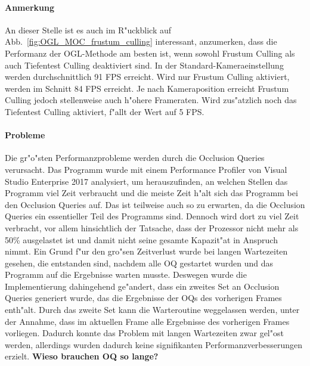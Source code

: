 \documentclass[journal]{vgtc}
\begin{document}
\paragraph{Anmerkung} An dieser Stelle ist es auch im R"uckblick auf Abb.\ \ref{fig:OGL_MOC_frustum_culling} interessant, anzumerken, dass die Performanz der OGL-Methode am besten ist, wenn sowohl Frustum Culling als auch Tiefentest Culling deaktiviert sind. In der Standard-Kameraeinstellung werden durchschnittlich 91 FPS erreicht. Wird nur Frustum Culling aktiviert, werden im Schnitt 84 FPS erreicht.
Je nach Kameraposition erreicht Frustum Culling jedoch stellenweise auch h"ohere Frameraten.
Wird zus"atzlich noch das Tiefentest Culling aktiviert, f"allt der Wert auf 5 FPS.\\

\paragraph{Probleme} Die gr"o"sten Performanzprobleme werden durch die Occlusion Queries verursacht.
Das Programm wurde mit einem Performance Profiler von Visual Studio Enterprise 2017 analysiert, um herauszufinden, an welchen Stellen das Programm viel Zeit verbraucht und die meiste Zeit h"alt sich das Programm bei den Occlusion Queries auf.
Das ist teilweise auch so zu erwarten, da die Occlusion Queries ein essentieller Teil des Programms sind. Dennoch wird dort zu viel Zeit verbracht, vor allem hinsichtlich der Tatsache, dass der Prozessor nicht mehr als 50\% ausgelastet ist und damit nicht seine gesamte Kapazit"at in Anspruch nimmt.
Ein Grund f"ur den gro"sen Zeitverlust wurde bei langen Wartezeiten gesehen, die entstanden sind, nachdem alle OQ gestartet wurden und das Programm auf die Ergebnisse warten musste.
Deswegen wurde die Implementierung dahingehend ge"andert, dass ein zweites Set an Occlusion Queries generiert wurde, das die Ergebnisse der OQs des vorherigen Frames enth"alt.
Durch das zweite Set kann die Warteroutine weggelassen werden, unter der Annahme, dass im aktuellen Frame alle Ergebnisse des vorherigen Frames vorliegen.
Dadurch konnte das Problem mit langen Wartezeiten zwar gel"ost werden, allerdings wurden dadurch keine signifikanten Performanzverbesserungen erzielt.
\textbf{Wieso brauchen OQ so lange?}
\end{document}
